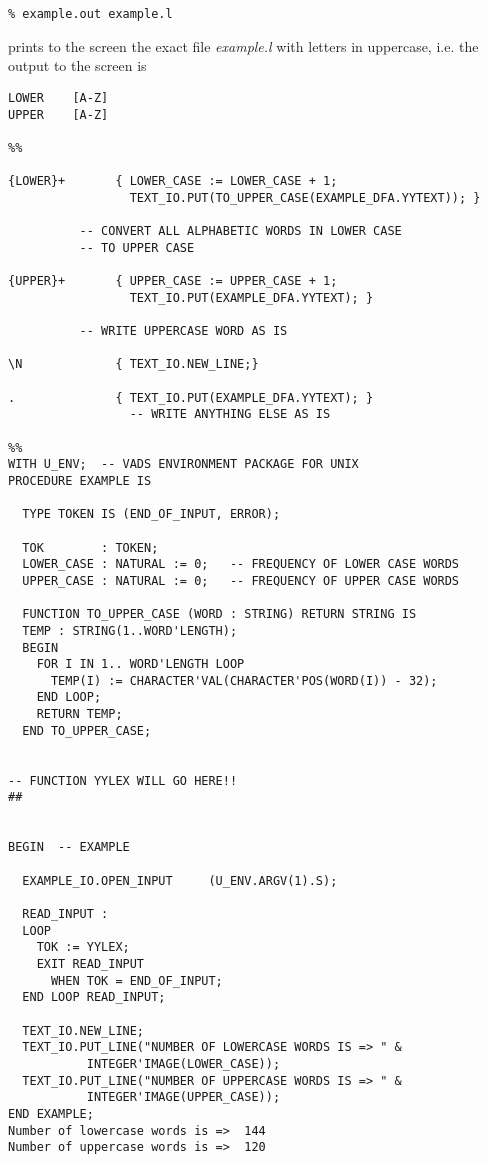 \small
\begin{verbatim}
% example.out example.l
\end{verbatim}
\normalsize

prints to the screen the exact file {\it example.l} with letters in 
uppercase, i.e. the output to the screen is

\newpage
\small
\begin{verbatim}
LOWER    [A-Z]
UPPER    [A-Z]

%%

{LOWER}+       { LOWER_CASE := LOWER_CASE + 1; 
                 TEXT_IO.PUT(TO_UPPER_CASE(EXAMPLE_DFA.YYTEXT)); }

		  -- CONVERT ALL ALPHABETIC WORDS IN LOWER CASE
		  -- TO UPPER CASE

{UPPER}+       { UPPER_CASE := UPPER_CASE + 1;
                 TEXT_IO.PUT(EXAMPLE_DFA.YYTEXT); }

		  -- WRITE UPPERCASE WORD AS IS

\N             { TEXT_IO.NEW_LINE;}

.              { TEXT_IO.PUT(EXAMPLE_DFA.YYTEXT); }
                 -- WRITE ANYTHING ELSE AS IS

%%
WITH U_ENV;  -- VADS ENVIRONMENT PACKAGE FOR UNIX
PROCEDURE EXAMPLE IS

  TYPE TOKEN IS (END_OF_INPUT, ERROR);

  TOK        : TOKEN;
  LOWER_CASE : NATURAL := 0;   -- FREQUENCY OF LOWER CASE WORDS
  UPPER_CASE : NATURAL := 0;   -- FREQUENCY OF UPPER CASE WORDS

  FUNCTION TO_UPPER_CASE (WORD : STRING) RETURN STRING IS
  TEMP : STRING(1..WORD'LENGTH);
  BEGIN
    FOR I IN 1.. WORD'LENGTH LOOP
      TEMP(I) := CHARACTER'VAL(CHARACTER'POS(WORD(I)) - 32); 
    END LOOP;
    RETURN TEMP;
  END TO_UPPER_CASE;
  

-- FUNCTION YYLEX WILL GO HERE!!
##


BEGIN  -- EXAMPLE

  EXAMPLE_IO.OPEN_INPUT     (U_ENV.ARGV(1).S);

  READ_INPUT :
  LOOP
    TOK := YYLEX;
    EXIT READ_INPUT
      WHEN TOK = END_OF_INPUT;
  END LOOP READ_INPUT;

  TEXT_IO.NEW_LINE;
  TEXT_IO.PUT_LINE("NUMBER OF LOWERCASE WORDS IS => " & 
		   INTEGER'IMAGE(LOWER_CASE));
  TEXT_IO.PUT_LINE("NUMBER OF UPPERCASE WORDS IS => " & 
		   INTEGER'IMAGE(UPPER_CASE));
END EXAMPLE;
Number of lowercase words is =>  144
Number of uppercase words is =>  120
\end{verbatim}
\normalsize


